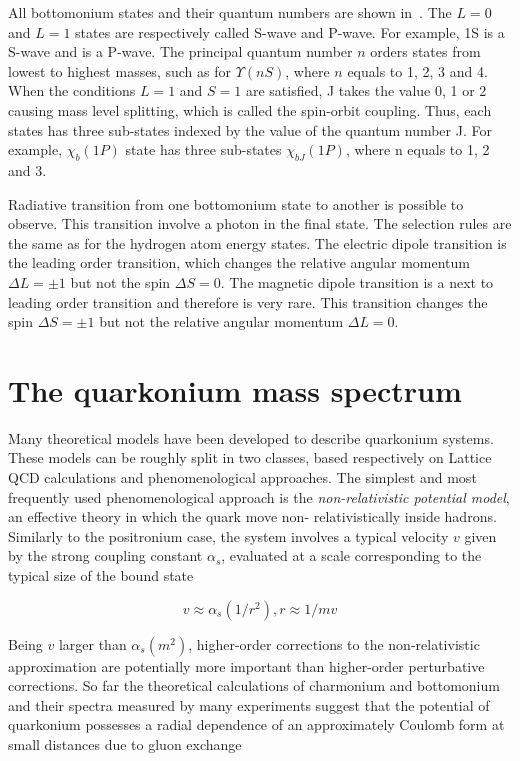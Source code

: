 



All bottomonium states and their quantum numbers are shown
in~. The $L = 0$ and $L = 1$ states are respectively
called S-wave and P-wave. For example, \Y1S is a S-wave and \chiboneOneP is a
P-wave. The principal quantum number $n$ orders states from lowest to highest
masses, such as for $\Upsilon(nS)$, where $n$ equals to 1, 2, 3 and 4. When the
conditions $L = 1$ and $S = 1$ are satisfied, J takes the value 0, 1 or 2
causing mass level splitting, which is called the spin-orbit coupling. Thus,
each \chib states has three sub-states indexed by the value of the quantum
number J. For example, $\chi_b(1P)$ state has three sub-states $\chi_{bJ}(1P)$,
where n equals to 1, 2 and 3.

Radiative transition from one bottomonium state to another is possible to
observe. This transition involve a photon in the final state. The selection
rules are the same as for the hydrogen atom energy states. The electric dipole
transition is the leading order transition, which changes the relative angular
momentum $\Delta L  = \pm 1$ but not the spin $\Delta S = 0$. The magnetic
dipole transition is a next to leading order transition and therefore is very
rare. This transition changes the spin $\Delta S = \pm 1$ but not the relative
angular momentum $\Delta L = 0$.

\section{The quarkonium mass spectrum}

Many theoretical models have been developed to describe quarkonium systems.
These models can be roughly split in two classes, based respectively on Lattice
QCD calculations and phenomenological approaches. The simplest and most
frequently used phenomenological approach is the {\it non-relativistic
potential model}, an effective theory in which the quark move non-
relativistically inside hadrons. Similarly to the positronium case, the system
involves a typical velocity $v$ given by the strong coupling constant
$\alpha_s$, evaluated at a scale corresponding to the typical size of the bound
state

\begin{equation}
v \approx \alpha_s(1/r^2), r \approx 1/mv
\end{equation}

\noindent Being $v$ larger than $\alpha_s(m^2)$, higher-order corrections to the 
non-relativistic approximation are potentially more important than higher-order
perturbative corrections. So far the theoretical calculations of charmonium and
bottomonium and their spectra measured by many experiments suggest that the
potential of quarkonium possesses a radial dependence of an approximately
Coulomb form at small distances due to gluon exchange

